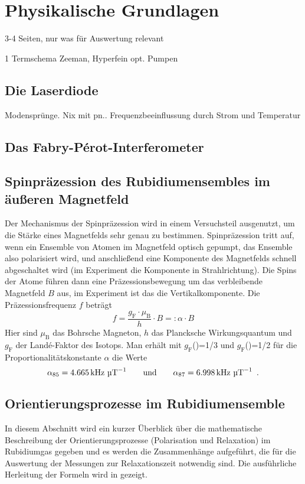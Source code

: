 \section{Physikalische Grundlagen}

3-4 Seiten, nur was für Auswertung relevant

1 Termschema
Zeeman, Hyperfein
opt. Pumpen


\subsection{Die Laserdiode}
Modensprünge. Nix mit pn..
Frequenzbeeinflussung durch Strom und Temperatur


\subsection{Das Fabry-Pérot-Interferometer}

\subsection{Spinpräzession des Rubidiumensembles im äußeren Magnetfeld}
Der Mechanismus der Spinpräzession wird in einem Versuchsteil ausgenutzt,
um die Stärke eines Magnetfelds sehr genau zu bestimmen.
Spinpräzession tritt auf, wenn ein Ensemble von Atomen im Magnetfeld optisch gepumpt,
das Ensemble also polarisiert wird, und anschließend eine Komponente
des Magnetfelds schnell abgeschaltet wird (im Experiment die Komponente in Strahlrichtung).
Die Spins der Atome führen dann eine Präzessionsbewegung um das verbleibende Magnetfeld $B$ aus,
im Experiment ist das die Vertikalkomponente.
Die Präzessionsfrequenz $f$ beträgt \cite{staatsex}
\begin{equation}
  f=\frac{g_\text{F} \cdot \mu_\text{B}}{h} \cdot B=: \alpha \cdot B
\end{equation}
Hier sind $\mu_\text{B}$ das Bohrsche Magneton, $h$ das Plancksche Wirkungsquantum und
$g_\text{F}$ der Landé-Faktor des Isotops.
Man erhält mit $g_\text{F}$()=1/3 und $g_\text{F}$()=1/2 \cite{staatsex} für 
die Proportionalitätskonstante $\alpha$ die Werte
\begin{equation}
  \alpha_{85}=4.665\,\text{kHz } \text{\textmu T}^{-1} \qquad \text{und} \qquad	\alpha_{87}=6.998\,\text{kHz } \text{\textmu T}^{-1} \ \, .
\end{equation}



\subsection{Orientierungsprozesse im Rubidiumensemble}
In diesem Abschnitt wird ein kurzer Überblick über die mathematische Beschreibung der Orientierungsprozesse
(Polarisation und Relaxation) im Rubidiumgas gegeben und es werden die Zusammenhänge aufgeführt, die für die
Auswertung der Messungen zur Relaxationszeit notwendig sind.
Die ausführliche Herleitung der Formeln wird in \cite{staatsex} gezeigt.

